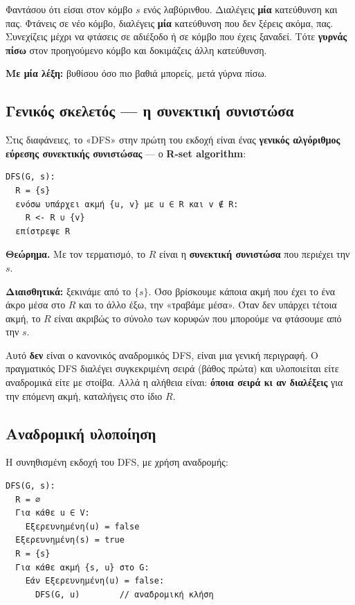 \documentclass[11pt,a4paper]{article}
\begin{document}
Φαντάσου ότι είσαι στον κόμβο $s$ ενός λαβύρινθου. Διαλέγεις \textbf{μία}
κατεύθυνση και πας. Φτάνεις σε νέο κόμβο, διαλέγεις \textbf{μία} κατεύθυνση που
δεν ξέρεις ακόμα, πας. Συνεχίζεις μέχρι να φτάσεις σε αδιέξοδο ή σε κόμβο που
έχεις ξαναδεί. Τότε \textbf{γυρνάς πίσω} στον προηγούμενο κόμβο και δοκιμάζεις
άλλη κατεύθυνση.

\textbf{Με μία λέξη:} βυθίσου όσο πιο βαθιά μπορείς, μετά γύρνα πίσω.

\subsection{Γενικός σκελετός --- η συνεκτική συνιστώσα}

Στις διαφάνειες, το «DFS» στην πρώτη του εκδοχή είναι ένας \textbf{γενικός
αλγόριθμος εύρεσης συνεκτικής συνιστώσας} --- ο \textbf{R-set algorithm}:

\begin{codebox}
\begin{verbatim}
DFS(G, s):
  R = {s}
  ενόσω υπάρχει ακμή {u, v} με u ∈ R και v ∉ R:
    R <- R ∪ {v}
  επίστρεψε R
\end{verbatim}
\end{codebox}

\textbf{Θεώρημα.} Με τον τερματισμό, το $R$ είναι η \textbf{συνεκτική συνιστώσα}
που περιέχει την $s$.

\textbf{Διαισθητικά:} ξεκινάμε από το $\{s\}$. Όσο βρίσκουμε κάποια ακμή που έχει
το ένα άκρο μέσα στο $R$ και το άλλο έξω, την «τραβάμε μέσα». Όταν δεν υπάρχει
τέτοια ακμή, το $R$ είναι ακριβώς το σύνολο των κορυφών που μπορούμε να φτάσουμε
από την $s$.

\begin{intuition}
Αυτό \textbf{δεν} είναι ο κανονικός αναδρομικός DFS, είναι μια γενική περιγραφή.
Ο πραγματικός DFS διαλέγει συγκεκριμένη σειρά (βάθος πρώτα) και υλοποιείται είτε
αναδρομικά είτε με στοίβα. Αλλά η αλήθεια είναι: \textbf{όποια σειρά κι αν
διαλέξεις} για την επόμενη ακμή, καταλήγεις στο ίδιο $R$.
\end{intuition}

\subsection{Αναδρομική υλοποίηση}

Η συνηθισμένη εκδοχή του DFS, με χρήση αναδρομής:

\begin{codebox}
\begin{verbatim}
DFS(G, s):
  R = ∅
  Για κάθε u ∈ V:
    Εξερευνημένη(u) = false
  Εξερευνημένη(s) = true
  R = {s}
  Για κάθε ακμή {s, u} στο G:
    Εάν Εξερευνημένη(u) = false:
      DFS(G, u)        // αναδρομική κλήση
\end{verbatim}
\end{codebox}
\end{document}
